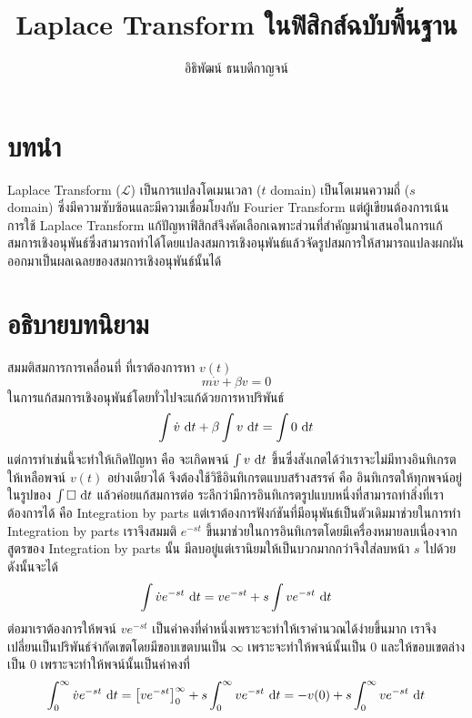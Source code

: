 \documentclass[a4paper,12pt]{article}
\title{Laplace Transform ในฟิสิกส์ฉบับพื้นฐาน}
\author{อิธิพัฒน์ ธนบดีกาญจน์}
\begin{document}
\maketitle

\section{บทนำ}
Laplace Transform ($\mathscr{L}$) เป็นการแปลงโดเมนเวลา ($t$ domain) เป็นโดเมนความถี่ ($s$ domain)
ซึ่งมีความซับซ้อนและมีความเชื่อมโยงกับ Fourier Transform แต่ผู้เขียนต้องการเน้นการใช้ Laplace Transform แก้ปัญหาฟิสิกส์จึงคัดเลือกเฉพาะส่วนที่สำคัญมานำเสนอในการแก้สมการเชิงอนุพันธ์ซึ่งสามารถทำได้โดยแปลงสมการเชิงอนุพันธ์แล้วจัดรูปสมการให้สามารถแปลงผกผันออกมาเป็นผลเฉลยของสมการเชิงอนุพันธ์นั้นได้

\section{อธิบายบทนิยาม}
สมมติสมการการเคลื่อนที่ ที่เราต้องการหา $v(t)$
\begin{equation*}
	m\dot{v}+\beta v=0
\end{equation*}
ในการแก้สมการเชิงอนุพันธ์โดยทั่วไปจะแก้ด้วยการหาปริพันธ์
\begin{equation*}
	\int\dot{v}\,\dl t+\beta\int v\,\dl t=\int 0\,\dl t
\end{equation*}
แต่การทำเช่นนี้จะทำให้เกิดปัญหา คือ จะเกิดพจน์ $\int v\,\dl t$ ขึ้นซึ่งสังเกตได้ว่าเราจะไม่มีทางอินทิเกรตให้เหลือพจน์ $v(t)$ อย่างเดียวได้ จึงต้องใช้วิธีอินทิเกรตแบบสร้างสรรค์ คือ อินทิเกรตให้ทุกพจน์อยู่ในรูปของ $\int \square\,\dl t$ แล้วค่อยแก้สมการต่อ ระลึกว่ามีการอินทิเกรตรูปแบบหนึ่งที่สามารถทำสิ่งที่เราต้องการได้ คือ Integration by parts แต่เราต้องการฟังก์ชันที่มีอนุพันธ์เป็นตัวเดิมมาช่วยในการทำ Integration by parts เราจึงสมมติ $e^{-st}$ ขึ้นมาช่วยในการอินทิเกรตโดยมีเครื่องหมายลบเนื่องจากสูตรของ Integration by parts นั้น มีลบอยู่แต่เรานิยมให้เป็นบวกมากกว่าจึงใส่ลบหน้า $s$ ไปด้วย ดังนั้นจะได้
\begin{equation*}
	\int \dot{v}e^{-st}\,\dl t=ve^{-st}+s\int ve^{-st}\,\dl t
\end{equation*}
ต่อมาเราต้องการให้พจน์ $ve^{-st}$ เป็นค่าคงที่ค่าหนึ่งเพราะจะทำให้เราคำนวณได้ง่ายขึ้นมาก เราจึงเปลี่ยนเป็นปริพันธ์จำกัดเขตโดยมีขอบเขตบนเป็น $\infty$ เพราะจะทำให้พจน์นั้นเป็น $0$ และให้ขอบเขตล่างเป็น $0$ เพราะจะทำให้พจน์นั้นเป็นค่าคงที่
\begin{equation*}
	\int_0^\infty \dot{v}e^{-st}\,\dl t=\left[ve^{-st}\right]_0^\infty+s\int_0^\infty ve^{-st}\,\dl t=-v(0)+s\int_0^\infty ve^{-st}\,\dl t
\end{equation*}
\end{document}
